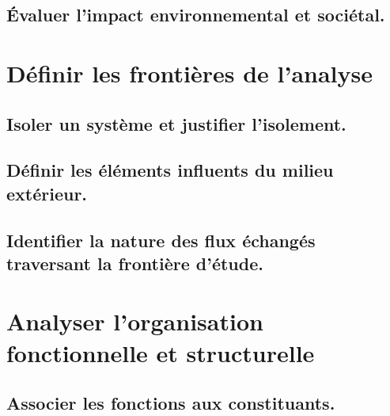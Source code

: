 \documentclass[10pt,fleqn]{book}
\begin{document}
\begin{multicols}{2} 

\end{multicols}

\subsection{Évaluer l’impact environnemental et sociétal.} 

\begin{multicols}{2} 

\end{multicols}

\section{Définir les frontières de l'analyse} 

\subsection{Isoler un système et justifier l’isolement.} 

\begin{multicols}{2} 

\end{multicols}

\subsection{Définir les éléments influents du milieu extérieur. } 

\begin{multicols}{2} 

\end{multicols}

\subsection{Identifier la nature des flux échangés traversant la frontière d’étude.} 

\begin{multicols}{2} 

\end{multicols}

\section{Analyser l'organisation fonctionnelle et structurelle} 

\subsection{Associer les fonctions aux constituants.} 
\end{document}
